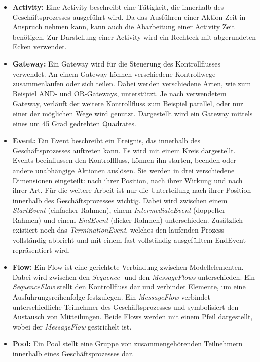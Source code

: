 \begin{itemize}
    \item \textbf{Activity:} 
    Eine Activity beschreibt eine Tätigkeit, die innerhalb des Geschäftsprozesses ausgeführt wird.
    Da das Ausführen einer Aktion Zeit in Anspruch nehmen kann, kann auch die Abarbeitung einer Activity Zeit benötigen.
    Zur Darstellung einer Activity wird ein Rechteck mit abgerundeten Ecken verwendet.
    \item \textbf{Gateway:}
    Ein Gateway wird für die Steuerung des Kontrollflusses verwendet. 
    An einem Gateway können verschiedene Kontrollwege zusammenlaufen oder sich teilen. 
    Dabei werden verschiedene Arten, wie zum Beispiel AND- und OR-Gateways, unterstützt. 
    Je nach verwendetem Gateway, verläuft der weitere Kontrollfluss zum Beispiel parallel, oder nur einer der möglichen Wege wird genutzt.
    Dargestellt wird ein Gateway mittels eines um 45 Grad gedrehten Quadrates. 
    \item \textbf{Event:}
    Ein Event beschreibt ein Ereignis, das innerhalb des Geschäftsprozesses auftreten kann.
    Es wird mit einem Kreis dargestellt.
    Events beeinflussen den Kontrollfluss, können ihn starten, beenden oder andere unabhängige Aktionen auslösen.
    Sie werden in drei verschiedene Dimensionen eingeteilt: nach ihrer Position, nach ihrer Wirkung und nach ihrer Art.
    Für die weitere Arbeit ist nur die Unterteilung nach ihrer Position innerhalb des Geschäftsprozesses wichtig.
    Dabei wird zwischen einem \emph{StartEvent} (einfacher Rahmen), einem \emph{IntermediateEvent} (doppelter Rahmen) und einem \emph{EndEvent} (dicker Rahmen) unterschieden.
    Zusätzlich existiert noch das \emph{TerminationEvent}, welches den laufenden Prozess vollständig abbricht und mit einem fast vollständig ausgefülltem EndEvent repräsentiert wird.
    \item \textbf{Flow:}
    Ein Flow ist eine gerichtete Verbindung zwischen Modellelementen.
    Dabei wird zwischen den \emph{Sequence-} und den \emph{MessageFlows} unterschieden.
    Ein \emph{SequenceFlow} stellt den Kontrollfluss dar und verbindet Elemente, um eine Ausführungsreihenfolge festzulegen.
    Ein \emph{MessageFlow} verbindet unterschiedliche Teilnehmer des Geschäftsprozesses und symbolisiert den Austausch von Mitteilungen.
    Beide Flows werden mit einem Pfeil dargestellt, wobei der \emph{MessageFlow} gestrichelt ist.
    \item \textbf{Pool:}
    Ein Pool stellt eine Gruppe von zusammengehörenden Teilnehmern innerhalb eines Geschäftsprozesses dar.

\end{itemize}
